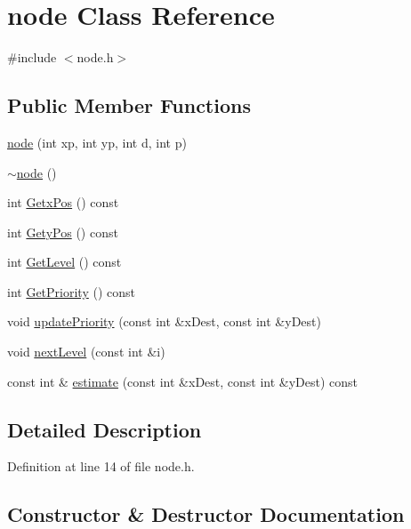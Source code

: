 \hypertarget{classnode}{}\section{node Class Reference}
\label{classnode}


{\ttfamily \#include $<$node.\+h$>$}

\subsection*{Public Member Functions}
\begin{DoxyCompactItemize}
\item 
\hyperlink{classnode_a802701cab6639590de6f16136184c2de}{node} (int xp, int yp, int d, int p)
\item 
\hyperlink{classnode_a482f83436a89f09d289b26144d817adf}{$\sim$node} ()
\item 
int \hyperlink{classnode_a32e22b8a1fb6be6efa7348cc848600cf}{Getx\+Pos} () const
\item 
int \hyperlink{classnode_a0d644ed02899013bdc6e222afefb4c25}{Gety\+Pos} () const
\item 
int \hyperlink{classnode_a8f168b85b9bdf0a837f5070e5af6f009}{Get\+Level} () const
\item 
int \hyperlink{classnode_afa8c64a3cf2d61348b69b7e68233aa8d}{Get\+Priority} () const
\item 
void \hyperlink{classnode_ad51b92de008bd5107a7b55cc61fc497b}{update\+Priority} (const int \&x\+Dest, const int \&y\+Dest)
\item 
void \hyperlink{classnode_a04a186013c42fb942b6da90d2e98d4ed}{next\+Level} (const int \&i)
\item 
const int \& \hyperlink{classnode_acd0a1c2330a9984fa120fe7a6f169680}{estimate} (const int \&x\+Dest, const int \&y\+Dest) const
\end{DoxyCompactItemize}


\subsection{Detailed Description}


Definition at line 14 of file node.\+h.



\subsection{Constructor \& Destructor Documentation}
\mbox{\label{classnode_a802701cab6639590de6f16136184c2de}} 
